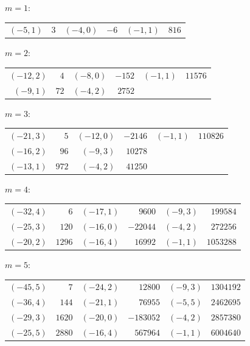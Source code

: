 \documentclass[11pt]{amsart}
\theoremstyle{definition}
\begin{document}
\noindent$m=1$:\nopagebreak\\[2pt]
{\small\begin{tabular}{@{}r@{\ \ }r@{\qquad}r@{\ \ }r@{\qquad}r@{\ \ }r@{}}
$(-5,1)$ & $3$ & $(-4,0)$ & $-6$ & $(-1,1)$ & $816$ \\
\end{tabular}}\par\medskip
\noindent$m=2$:\nopagebreak\\[2pt]
{\small\begin{tabular}{@{}r@{\ \ }r@{\qquad}r@{\ \ }r@{\qquad}r@{\ \ }r@{}}
$(-12,2)$ & $4$ & $(-8,0)$ & $-152$ & $(-1,1)$ & $11576$ \\
$(-9,1)$ & $72$ & $(-4,2)$ & $2752$ & & \\
\end{tabular}}\par\medskip
\noindent$m=3$:\nopagebreak\\[2pt]
{\small\begin{tabular}{@{}r@{\ \ }r@{\qquad}r@{\ \ }r@{\qquad}r@{\ \ }r@{}}
$(-21,3)$ & $5$ & $(-12,0)$ & $-2146$ & $(-1,1)$ & $110826$ \\
$(-16,2)$ & $96$ & $(-9,3)$ & $10278$ & & \\
$(-13,1)$ & $972$ & $(-4,2)$ & $41250$ & & \\
\end{tabular}}\par\medskip
\noindent$m=4$:\nopagebreak\\[2pt]
{\small\begin{tabular}{@{}r@{\ \ }r@{\qquad}r@{\ \ }r@{\qquad}r@{\ \ }r@{}}
$(-32,4)$ & $6$ & $(-17,1)$ & $9600$ & $(-9,3)$ & $199584$ \\
$(-25,3)$ & $120$ & $(-16,0)$ & $-22044$ & $(-4,2)$ & $272256$ \\
$(-20,2)$ & $1296$ & $(-16,4)$ & $16992$ & $(-1,1)$ & $1053288$ \\
\end{tabular}}\par\medskip
\noindent$m=5$:\nopagebreak\\[2pt]
{\small\begin{tabular}{@{}r@{\ \ }r@{\qquad}r@{\ \ }r@{\qquad}r@{\ \ }r@{}}
$(-45,5)$ & $7$ & $(-24,2)$ & $12800$ & $(-9,3)$ & $1304192$ \\
$(-36,4)$ & $144$ & $(-21,1)$ & $76955$ & $(-5,5)$ & $2462695$ \\
$(-29,3)$ & $1620$ & $(-20,0)$ & $-183052$ & $(-4,2)$ & $2857380$ \\
$(-25,5)$ & $2880$ & $(-16,4)$ & $567964$ & $(-1,1)$ & $6004640$ \\
\end{tabular}}\par\medskip
\end{document}
